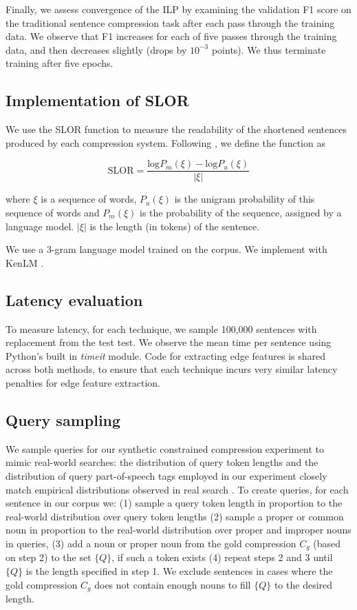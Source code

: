 Finally, we assess convergence of the ILP by examining the validation F1 score on the traditional sentence compression task after each pass through the training data. We observe that F1 increases for each of five passes through the training data, and then decreases slightly (drops by $10^{-3}$ points). We thus terminate training after five epochs. 

\subsection{Implementation of SLOR}

We use the SLOR function to measure the readability of the shortened sentences produced by each compression system. Following \cite{lau2015unsupervised}, we define the function as 

\begin{equation}
\text{SLOR}=\frac{\text{log}P_m(\xi) - \text{log}P_u(\xi)}{|\xi|}
\end{equation}

where $\xi$ is a sequence of words, $P_u(\xi)$ is the unigram probability of this sequence of words and $P_m(\xi)$ is the probability of the sequence, assigned by a language model.  $|\xi|$ is the length (in tokens) of the sentence.

We use a 3-gram language model trained on the \citet{filippova2013overcoming} corpus. We implement with KenLM \cite{Heafield-kenlm}.

\subsection{Latency evaluation}
To measure latency, for each technique, we sample 100,000 sentences with replacement from the test test. We observe the mean time per sentence using Python's built in \textit{timeit} module. Code for extracting edge features is shared across both methods, to ensure that each technique incurs very similar latency penalties for edge feature extraction. 

\subsection{Query sampling}
We sample queries for our synthetic constrained compression experiment to mimic real-world searches: the distribution of query token lengths and the distribution of query part-of-speech tags employed in our experiment closely match empirical distributions observed in real search \cite{Jansen2000RealLR,Barr2008TheLS}. To create queries, for each sentence in our corpus we: (1) sample a query token length in proportion to the real-world distribution over query token lengths (2) sample a proper or common noun in proportion to the real-world distribution over proper and improper nouns in queries, (3) add a noun or proper noun from the gold compression $C_g$ (based on step 2) to the set $\{Q\}$, if such a token exists (4) repeat steps 2 and 3 until $\{Q\}$ is the length specified in step 1. We exclude sentences in cases where the gold compression $C_g$ does not contain enough nouns to fill $\{Q\}$ to the desired length.


